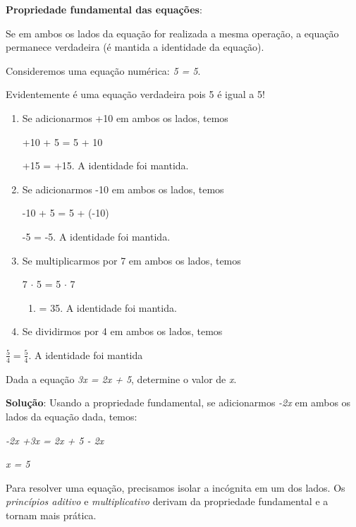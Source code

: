 \textbf{Propriedade fundamental das equações}:

\begin{caixa}
Se em ambos os lados da equação for realizada a mesma operação, a equação permanece verdadeira (é mantida a identidade da equação).
\end{caixa}

\begin{texemplo}
Consideremos uma equação numérica:   \textit{5 = 5}.

Evidentemente é uma equação verdadeira pois 5 é igual a 5!

\begin{enumerate}
\item Se adicionarmos +10 em ambos os lados, temos

+10 + 5 = 5 + 10

+15 = +15. A identidade foi mantida.

	\item Se adicionarmos -10 em ambos os lados, temos

-10 + 5 = 5 + (-10)

-5 = -5. A identidade foi mantida.

	\item Se multiplicarmos por 7 em ambos os lados, temos

7 $ \cdot $  5 = 5 $ \cdot $  7

\begin{enumerate}
	\item = 35. A identidade foi mantida.
\end{enumerate}

	\item Se dividirmos por 4 em ambos os lados, temos
\end{enumerate}

\( \frac{5}{4}=\frac{5}{4} \). A identidade foi mantida\qedsymbol{}
\end{texemplo}

\begin{texemplo}
Dada a equação \textit{3x = 2x + 5}, determine o valor de \textit{x}.

\textbf{Solução}: Usando a propriedade fundamental, se adicionarmos \textit{-2x} em ambos os lados da equação dada, temos:

\textit{-2x +3x = 2x + 5 - 2x}

\textit{x = 5}\qedsymbol{}
\end{texemplo}

Para resolver uma equação, precisamos isolar a incógnita em um dos lados. Os \textit{princípios aditivo} e \textit{multiplicativo} derivam da propriedade fundamental e a tornam mais prática.

